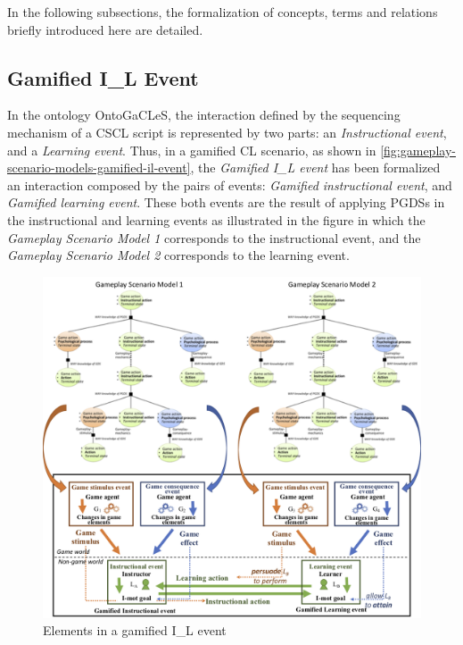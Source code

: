 In the following subsections, the formalization of concepts, terms and relations briefly introduced here are detailed.

\subsection{Gamified I\_L Event}
\label{subsec:gamified-il-event}

In the ontology OntoGaCLeS, the interaction defined by the sequencing mechanism of a CSCL script is represented by two parts: an \emph{Instructional event}, and a \emph{Learning event}.
Thus, in a gamified CL scenario, as shown in \autoref{fig:gameplay-scenario-models-gamified-il-event}, the \emph{Gamified I\_L event} has been formalized an interaction composed by the pairs of events: \emph{Gamified instructional event}, and \emph{Gamified learning event}. 
These both events are the result of applying PGDSs in the instructional and learning events as illustrated in the figure in which the \emph{Gameplay Scenario Model 1} corresponds to the instructional event, and the \emph{Gameplay Scenario Model 2} corresponds to the learning event.

\begin{figure}[!htbp]
 \caption{Elements in a gamified I\_L event}
 \label{fig:gameplay-scenario-models-gamified-il-event}
 \centering
 \includegraphics[width=1\textwidth]{images/chap-ontogacles2/gameplay-scenario-models-gamified-il-event.png}
 \fautor
\end{figure}

